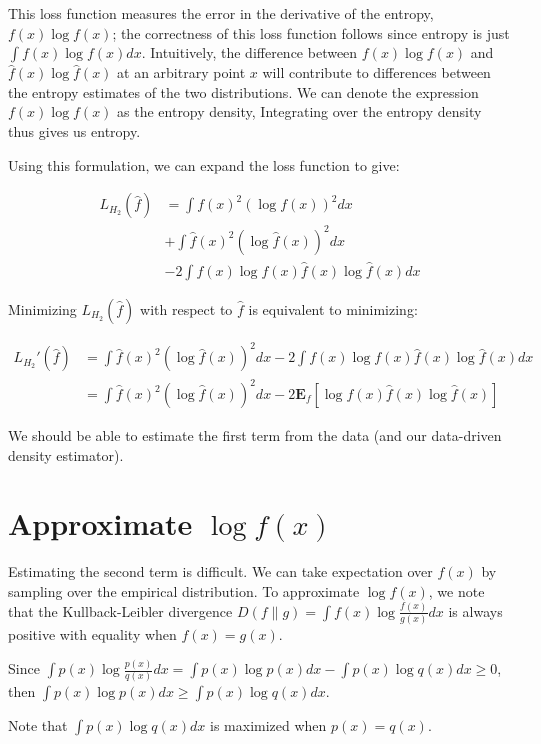 \documentclass{amsart}
\begin{document}
This loss function measures the error in the derivative of the entropy, $ f(x) \log f(x) $; the correctness of this loss function follows since entropy is just $ \int f(x) \log f(x) dx $. Intuitively, the difference between $ f(x) \log f(x) $ and $ \hat{f}(x) \log \hat{f}(x) $ at an arbitrary point $ x $ will contribute to differences between the entropy estimates of the two distributions. We can denote the expression $ f(x) \log f(x) $ as the entropy density, Integrating over the entropy density thus gives us entropy.

Using this formulation, we can expand the loss function to give:


\begin{align*}
L_{H_2}(\hat{f})& = \int f(x)^2 (\log f(x))^2 dx\\
& + \int \hat{f}(x)^2 (\log \hat{f}(x))^2 dx\\
& - 2 \int f(x) \log f(x) \hat{f}(x) \log \hat{f}(x) dx
\end{align*}




Minimizing $ L_{H_2}(\hat{f}) $ with respect to $ \hat{f} $ is equivalent to minimizing:

\begin{align*}
L_{H_2}'(\hat{f}) &= \int \hat{f}(x)^2 (\log \hat{f}(x))^2 dx  - 2 \int f(x) \log f(x) \hat{f}(x) \log \hat{f}(x) dx\\
& =\int \hat{f}(x)^2 (\log \hat{f}(x))^2 dx  - 2 \mathbf{E}_f[\log f(x) \hat{f}(x) \log \hat{f}(x)]
\end{align*}

We should be able to estimate the first term from the data (and our data-driven density estimator).

\section{Approximate $\log f(x)$}


Estimating the second term is difficult. We can take expectation over $ f(x) $ by sampling over the empirical distribution. To approximate $\log f(x)$, we note that the Kullback-Leibler divergence $ D(f\|g) = \int f(x) \log \frac{f(x)}{g(x)} dx $ is always positive with equality when $ f(x) = g(x) $.

Since $ \int p(x) \log \frac{p(x)}{q(x)} dx = \int p(x) \log p(x) dx - \int p(x) \log q(x) dx \geq 0 $, then $ \int p(x) \log p(x) dx \geq \int p(x) \log q(x) dx $.

Note that $ \int p(x) \log q(x) dx $ is maximized when $ p(x) = q(x) $.
\end{document}
